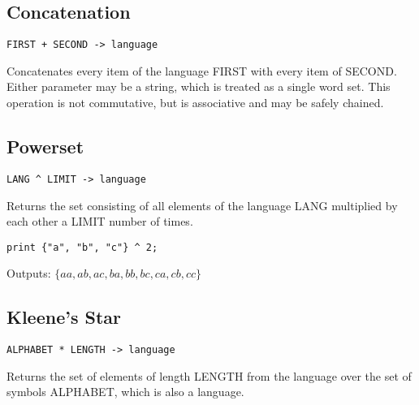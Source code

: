 \subsection{Concatenation}
\begin{center}
\begin{minipage}{5cm}
\begin{verbatim}
FIRST + SECOND -> language
\end{verbatim}
\end{minipage}
\end{center}
\begin{normalsize}
Concatenates every item of the language FIRST with every item of SECOND. Either parameter may be a string, which is treated as a single word set. This operation is not commutative, but is associative and may be safely chained.

\subsection{Powerset}
\begin{center}
\begin{minipage}{5cm}
\begin{verbatim}
LANG ^ LIMIT -> language
\end{verbatim}
\end{minipage}
\end{center}
\begin{normalsize}
Returns the set consisting of all elements of the language LANG multiplied by each other a LIMIT number of times.
\begin{center}
\begin{minipage}{5cm}
\begin{verbatim}
print {"a", "b", "c"} ^ 2;
\end{verbatim}
\end{minipage}
\end{center}
Outputs: $ \{aa, ab, ac, ba, bb, bc, ca, cb, cc\} $
\end{normalsize}

\subsection{Kleene's Star}
\begin{center}
\begin{minipage}{6cm}
\begin{verbatim}
ALPHABET * LENGTH -> language
\end{verbatim}
\end{minipage}
\end{center}
\begin{normalsize}
Returns the set of elements of length LENGTH from the language over the set of symbols ALPHABET, which is also a language.


\end{normalsize}
\end{normalsize}
